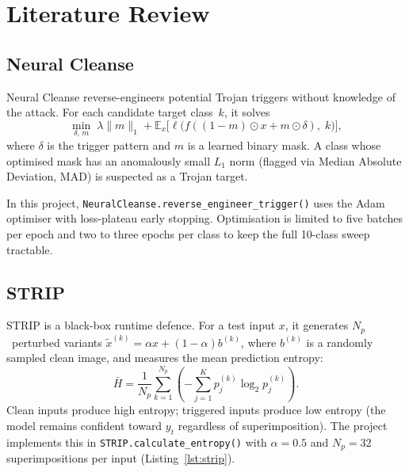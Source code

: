 \documentclass[12pt, letterpaper]{article}
\begin{document}
\section{Literature Review}
\label{sec:litreview}

\subsection{Neural Cleanse~\cite{wang2019neural}}

Neural Cleanse reverse-engineers potential Trojan triggers without knowledge of
the attack.  For each candidate target class~$k$, it solves
\begin{equation}
  \min_{\delta,\,m}\;\lambda\|m\|_1
  + \mathbb{E}_{x}\!\bigl[\ell\!\bigl(f((1-m)\odot x + m\odot\delta),\;k\bigr)\bigr],
\end{equation}
where $\delta$ is the trigger pattern and $m$ is a learned binary mask.  A
class whose optimised mask has an anomalously small $L_1$ norm (flagged via
Median Absolute Deviation, MAD) is suspected as a Trojan target.

In this project, \texttt{NeuralCleanse.reverse\_engineer\_trigger()} uses the
Adam optimiser with loss-plateau early stopping.  Optimisation is limited to
five batches per epoch and two to three epochs per class to keep the full
10-class sweep tractable.

\subsection{STRIP~\cite{gao2019strip}}

STRIP is a black-box runtime defence.  For a test input $x$, it generates
$N_p$~perturbed variants $\tilde{x}^{(k)} = \alpha x + (1-\alpha)b^{(k)}$,
where $b^{(k)}$ is a randomly sampled clean image, and measures the mean
prediction entropy:
\begin{equation}
  \bar{H} = \frac{1}{N_p}\sum_{k=1}^{N_p}
            \left(-\sum_{j=1}^{K} p_j^{(k)}\log_2 p_j^{(k)}\right).
\end{equation}
Clean inputs produce high entropy; triggered inputs produce low entropy
(the model remains confident toward $y_t$ regardless of superimposition).
The project implements this in \texttt{STRIP.calculate\_entropy()} with
$\alpha = 0.5$ and $N_p = 32$ superimpositions per input
(Listing~\ref{lst:strip}).
\end{document}
